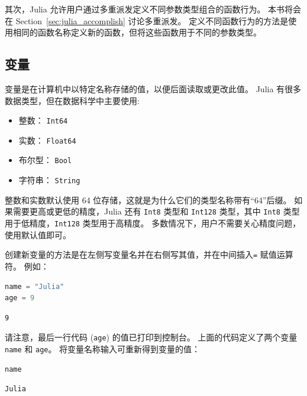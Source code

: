 \documentclass[
  notoc %
]{tufte-book}
\providecommand{\tightlist}{%
  \setlength{\itemsep}{0pt}\setlength{\parskip}{0pt}
}
\newcommand{\passthrough}[1]{#1}
\begin{document}
其次，Julia 允许用户通过多重派发定义不同参数类型组合的函数行为。
本书将会在 Section~\ref{sec:julia_accomplish} 讨论多重派发。
定义不同函数行为的方法是使用相同的函数名称定义新的函数，但将这些函数用于不同的参数类型。

\hypertarget{sec:variable}{%
\subsection{变量}\label{sec:variable}}

变量是在计算机中以特定名称存储的值，以便后面读取或更改此值。 Julia
有很多数据类型，但在数据科学中主要使用:

\begin{itemize}
\tightlist
\item
  整数： \passthrough{\lstinline!Int64!}
\item
  实数： \passthrough{\lstinline!Float64!}
\item
  布尔型： \passthrough{\lstinline!Bool!}
\item
  字符串： \passthrough{\lstinline!String!}
\end{itemize}

整数和实数默认使用 64 位存储，这就是为什么它们的类型名称带有``64''后缀。
如果需要更高或更低的精度，Julia 还有 \passthrough{\lstinline!Int8!}
类型和 \passthrough{\lstinline!Int128!} 类型，其中
\passthrough{\lstinline!Int8!}
类型用于低精度，\passthrough{\lstinline!Int128!} 类型用于高精度。
多数情况下，用户不需要关心精度问题，使用默认值即可。

创建新变量的方法是在左侧写变量名并在右侧写其值，并在中间插入\passthrough{\lstinline!=!}
赋值运算符。 例如：

\begin{lstlisting}[language=Julia]
name = "Julia"
age = 9
\end{lstlisting}

\begin{lstlisting}[language=Output]
9
\end{lstlisting}

请注意，最后一行代码 (\passthrough{\lstinline!age!})
的值已打印到控制台。 上面的代码定义了两个变量
\passthrough{\lstinline!name!} 和 \passthrough{\lstinline!age!}。
将变量名称输入可重新得到变量的值：

\begin{lstlisting}[language=Julia]
name
\end{lstlisting}

\begin{lstlisting}[language=Output]
Julia
\end{lstlisting}
\end{document}

